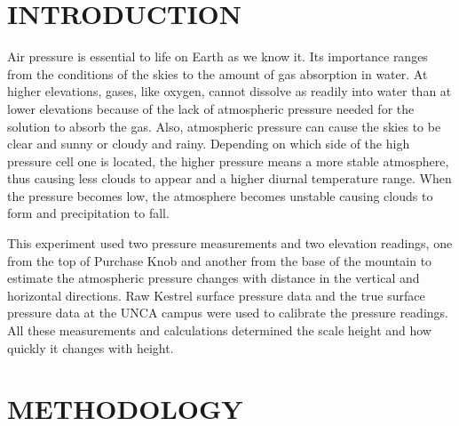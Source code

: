 \documentclass[twocolumn]{article}
\begin{document}
\section{{\normalsize \hspace{-0.195in} {\textbf{
INTRODUCTION
}}}} \vspace{-1.6mm}
\label{pres_intro.sec}
Air pressure is essential to life on Earth as we know it. Its importance ranges from the conditions of the skies to the amount of gas absorption in water. At higher elevations, gases, like oxygen, cannot dissolve as readily into water than at lower elevations because of the lack of atmospheric pressure needed for the solution to absorb the gas. Also, atmospheric pressure can cause the skies to be clear and sunny or cloudy and rainy. Depending on which side of the high pressure cell one is located, the higher pressure means a more stable atmosphere, thus causing less clouds to appear and a higher diurnal temperature range. When the pressure becomes low, the atmosphere becomes unstable causing clouds to form and precipitation to fall.

This experiment used two pressure measurements and two elevation readings, one from the top of Purchase Knob and another from the base of the mountain to estimate the atmospheric pressure changes with distance in the vertical and horizontal directions. Raw Kestrel surface pressure data and the true surface pressure data at the UNCA campus were used to calibrate the pressure readings. All these measurements and calculations determined the scale height and how quickly it changes with height. 
 
\section{{\normalsize \hspace{-0.195in} {\textbf{
METHODOLOGY
}}}} \vspace{-1.6mm}
\label{pres_method.sec}
\end{document}

